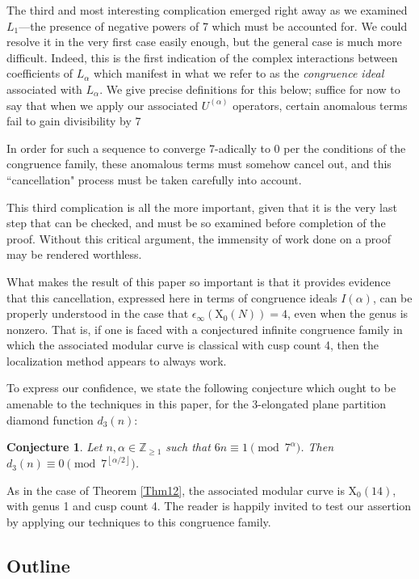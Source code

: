 \documentclass[reqno]{amsart}
\newtheorem{conjecture}[theorem]{Conjecture}
\theoremstyle{definition}
\theoremstyle{remark}
\numberwithin{equation}{section}
\begin{document}
The third and most interesting complication emerged right away as we examined $L_1$---the presence of negative powers of 7 which must be accounted for.  We could resolve it in the very first case easily enough, but the general case is much more difficult.  Indeed, this is the first indication of the complex interactions between coefficients of $L_{\alpha}$ which manifest in what we refer to as the \textit{congruence ideal} associated with $L_{\alpha}$.  We give precise definitions for this below; suffice for now to say that when we apply our associated $U^{(\alpha)}$ operators, certain anomalous terms fail to gain divisibility by 7

In order for such a sequence to converge 7-adically to 0 per the conditions of the congruence family, these anomalous terms must somehow cancel out, and this ``cancellation" process must be taken carefully into account.

This third complication is all the more important, given that it is the very last step that can be checked, and must be so examined before completion of the proof.  Without this critical argument, the immensity of work done on a proof may be rendered worthless.

What makes the result of this paper so important is that it provides evidence that this cancellation, expressed here in terms of congruence ideals $I(\alpha)$, can be properly understood in the case that $\epsilon_{\infty}\left( \mathrm{X}_0(N) \right)=4$, even when the genus is nonzero.  That is, if one is faced with a conjectured infinite congruence family in which the associated modular curve is classical with cusp count 4, then the localization method appears to always work.

To express our confidence, we state the following conjecture which ought to be amenable to the techniques in this paper, for the 3-elongated plane partition diamond function $d_3(n)$:

\begin{conjecture}\label{conj12}
Let $n,\alpha\in\mathbb{Z}_{\ge 1}$ such that $6n\equiv 1\pmod{7^{\alpha}}$.  Then $d_3(n)\equiv 0\pmod{7^{\left\lfloor\alpha/2\right\rfloor}}$.
\end{conjecture}  As in the case of Theorem \ref{Thm12}, the associated modular curve is $\mathrm{X}_0(14)$, with genus 1 and cusp count 4.  The reader is happily invited to test our assertion by applying our techniques to this congruence family.

\subsection{Outline}
\end{document}

